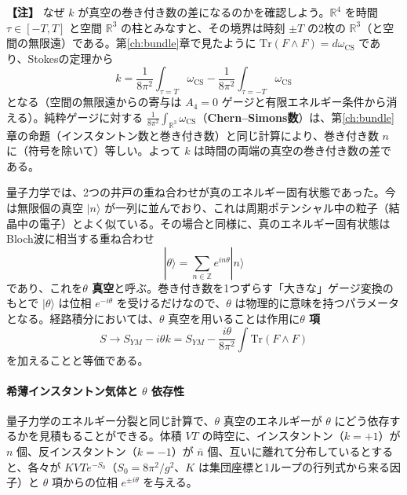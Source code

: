 \documentclass[uplatex, dvipdfmx, book]{jsbook}
\newenvironment{note}{\vspace{1ex}\par\footnotesize\noindent\textbf{【注】}}{\par\vspace{1ex}}
\begin{document}
\begin{note}
なぜ $k$ が真空の巻き付き数の差になるのかを確認しよう。$\mathbb{R}^4$ を時間 $\tau \in [-T, T]$ と空間 $\mathbb{R}^3$ の柱とみなすと、その境界は時刻 $\pm T$ の2枚の $\mathbb{R}^3$（と空間の無限遠）である。第\ref{ch:bundle}章で見たように $\mathrm{Tr}(F \wedge F) = d\omega_{\text{CS}}$ であり、Stokesの定理から
\begin{equation*}
    k = \frac{1}{8\pi^2}\int_{\tau = T} \omega_{\text{CS}} - \frac{1}{8\pi^2}\int_{\tau = -T} \omega_{\text{CS}}
\end{equation*}
となる（空間の無限遠からの寄与は $A_4 = 0$ ゲージと有限エネルギー条件から消える）。純粋ゲージに対する $\frac{1}{8\pi^2}\int_{\mathbb{R}^3}\omega_{\text{CS}}$（\textbf{Chern--Simons数}）は、第\ref{ch:bundle}章の命題（インスタントン数と巻き付き数）と同じ計算により、巻き付き数 $n$ に（符号を除いて）等しい。よって $k$ は時間の両端の真空の巻き付き数の差である。
\end{note}

量子力学では、2つの井戸の重ね合わせが真のエネルギー固有状態であった。今は無限個の真空 $|n\rangle$ が一列に並んでおり、これは周期ポテンシャル中の粒子（結晶中の電子）とよく似ている。その場合と同様に、真のエネルギー固有状態はBloch波に相当する重ね合わせ
\begin{equation}
    |\theta\rangle = \sum_{n \in \mathbb{Z}} e^{in\theta} |n\rangle
\end{equation}
であり、これを\textbf{$\theta$ 真空}と呼ぶ。巻き付き数を1つずらす「大きな」ゲージ変換のもとで $|\theta\rangle$ は位相 $e^{-i\theta}$ を受けるだけなので、$\theta$ は物理的に意味を持つパラメータとなる。経路積分においては、$\theta$ 真空を用いることは作用に\textbf{$\theta$ 項}
\begin{equation}
    S \to S_{YM} - i\theta k = S_{YM} - \frac{i\theta}{8\pi^2}\int\mathrm{Tr}(F \wedge F)
\end{equation}
を加えることと等価である。

\paragraph{希薄インスタントン気体と $\theta$ 依存性}
量子力学のエネルギー分裂と同じ計算で、$\theta$ 真空のエネルギーが $\theta$ にどう依存するかを見積もることができる。体積 $VT$ の時空に、インスタントン（$k = +1$）が $n$ 個、反インスタントン（$k = -1$）が $\bar{n}$ 個、互いに離れて分布しているとすると、各々が $KVTe^{-S_0}$（$S_0 = 8\pi^2/g^2$、$K$ は集団座標と1ループの行列式から来る因子）と $\theta$ 項からの位相 $e^{\pm i\theta}$ を与える。
\end{document}
